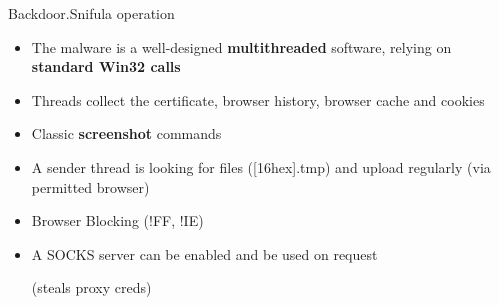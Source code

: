 \begin{frame}[t,fragile]{Backdoor.Snifula operation}
        \begin{itemize}
                \item The malware is a well-designed {\bf multithreaded} software, relying on {\bf standard Win32 calls}
                \item Threads collect the certificate, browser history, browser cache and cookies
                \item Classic {\bf screenshot} commands
                \item A sender thread is looking for files ([16hex].tmp) and upload regularly (via permitted browser)
                \item Browser Blocking (!FF, !IE)
                \item A SOCKS server can be enabled and be used on request
                
                (steals proxy creds)
        \end{itemize}
\end{frame}




